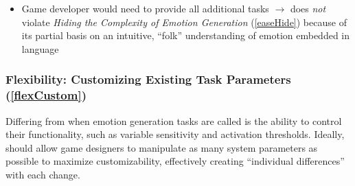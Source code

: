 \begin{itemize}
\begin{itemize}
\begin{itemize}
            \item Game developer would need to provide all additional tasks
            $\rightarrow$ does \textit{not} violate \textit{Hiding the
                Complexity of Emotion Generation} (\ref{easeHide}) because of
                its
            partial basis on an intuitive, ``folk'' understanding of emotion
            embedded in language~\citep[p.~74--75, 86--87]{oatley1992best}
        \end{itemize}
    \end{itemize}
\end{itemize}

\subsubsection{Flexibility: Customizing Existing Task Parameters
    (\ref{flexCustom})}
Differing from when emotion generation tasks are called is the ability to
control their functionality, such as variable sensitivity and activation
thresholds. Ideally, \progname{} should allow game designers to manipulate as
many system parameters as possible to maximize customizability, effectively
creating ``individual differences'' with each change.

